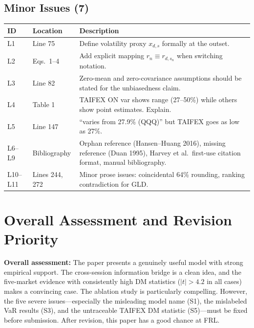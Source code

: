 \documentclass[12pt,a4paper]{article}
\begin{document}
\subsection*{Minor Issues (7)}

\begin{longtable}{p{1.2cm}p{2.5cm}p{10cm}}
\toprule
ID & Location & Description \\
\midrule
L1 & Line 75 & Define volatility proxy $x_{d,s}$ formally at the outset. \\
L2 & Eqs.\ 1--4 & Add explicit mapping $r_n \equiv r_{d,s_n}$ when switching notation. \\
L3 & Line 82 & Zero-mean and zero-covariance assumptions should be stated for the unbiasedness claim. \\
L4 & Table 1 & TAIFEX ON var shows range (27--50\%) while others show point estimates. Explain. \\
L5 & Line 147 & ``varies from 27.9\% (QQQ)'' but TAIFEX goes as low as 27\%. \\
L6--L9 & Bibliography & Orphan reference (Hansen--Huang 2016), missing reference (Duan 1995), Harvey et al.\ first-use citation format, manual bibliography. \\
L10--L11 & Lines 244, 272 & Minor prose issues: coincidental 64\% rounding, ranking contradiction for GLD. \\
\bottomrule
\end{longtable}

\bigskip

\section*{Overall Assessment and Revision Priority}

\textbf{Overall assessment:} The paper presents a genuinely useful model with strong empirical support. The cross-session information bridge is a clean idea, and the five-market evidence with consistently high DM statistics ($|t| > 4.2$ in all cases) makes a convincing case. The ablation study is particularly compelling. However, the five severe issues---especially the misleading model name (S1), the mislabeled VaR results (S3), and the untraceable TAIFEX DM statistic (S5)---must be fixed before submission. After revision, this paper has a good chance at FRL.
\end{document}
